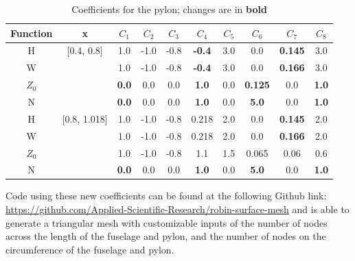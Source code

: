 \documentclass[journal]{new-aiaa}
\begin{document}
\begin{table}[ht]
\caption{Coefficients for the pylon; changes are in \textbf{bold}}
\centering
\begin{tabular}{cccccccccc}
Function & x & $C_{1}$ & $C_{2}$ & $C_{3}$ & $C_{4}$ & $C_{5}$ & $C_{6}$ & $C_{7}$ & $C_{8}$ \\
\hline
H          & [0.4, 0.8]  & 1.0             & -1.0 & -0.8 & \textbf{-0.4} & 3.0 & 0.0                  & \textbf{0.145} & 3.0 \\
W          &                 & 1.0             & -1.0 & -0.8 & \textbf{-0.4} & 3.0 & 0.0                  & \textbf{0.166} & 3.0 \\
$Z_{0}$ &                 & \textbf{0.0} & 0.0  & 0.0  & \textbf{1.0}  & 0.0  & \textbf{0.125} & 0.0                 & \textbf{1.0} \\
N           &                 & \textbf{0.0} & 0.0  & 0.0  & \textbf{1.0}  & 0.0  & \textbf{5.0}     & 0.0                 & \textbf{1.0} \\
\hline
H          & [0.8, 1.018]  & 1.0             & -1.0 & -0.8 & 0.218         & 2.0 & 0.0                 & \textbf{0.145} & 2.0 \\
W          &                     & 1.0             & -1.0 & -0.8 & 0.218         & 2.0 & 0.0                 & \textbf{0.166} & 2.0 \\
$Z_{0}$ &                     & 1.0             & -1.0 & -0.8 & 1.1             & 1.5 & 0.065             & 0.06               & 0.6 \\
N           &                     & \textbf{0.0} & 0.0  & 0.0  & \textbf{1.0} & 0.0 & \textbf{5.0}     & 0.0                 & \textbf{1.0} \\
\end{tabular}
\label{pycoeff}
\end{table}

Code using these new coefficients can be found at the following Github link:
\url{https://github.com/Applied-Scientific-Research/robin-surface-mesh} 
\cite{robinsurfmesh}
and is able to generate a triangular mesh with customizable inputs of the number
of nodes across the length of the fuselage and pylon, 
and the number of nodes on the circumference of the fuselage and pylon.

%

\end{document}
